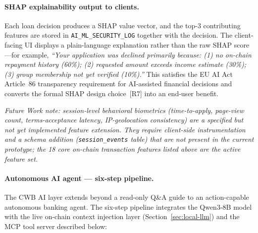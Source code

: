 \documentclass[12pt,a4paper]{report}
\begin{document}
\paragraph{SHAP explainability output to clients.}
Each loan decision produces a SHAP value vector, and the top-3 contributing features are stored in \texttt{AI\_ML\_SECURITY\_LOG} together with the decision. The client-facing UI displays a plain-language explanation rather than the raw SHAP score---for example, \emph{``Your application was declined primarily because: (1) no on-chain repayment history (60\%); (2) requested amount exceeds income estimate (30\%); (3) group membership not yet verified (10\%).''} This satisfies the EU AI Act Article~86 transparency requirement for AI-assisted financial decisions and converts the formal SHAP design choice~[R7] into an end-user benefit.

\noindent\textit{Future Work note: session-level behavioral biometrics (time-to-apply, page-view count, terms-acceptance latency, IP-geolocation consistency) are a specified but not yet implemented feature extension. They require client-side instrumentation and a schema addition (\texttt{session\_events} table) that are not present in the current prototype; the 18 core on-chain transaction features listed above are the active feature set.}

\paragraph{Autonomous AI agent --- six-step pipeline.}

The CWB AI layer extends beyond a read-only Q\&A guide to an action-capable autonomous banking agent. The six-step pipeline integrates the Qwen3-8B model with the live on-chain context injection layer (Section~\ref{sec:local-llm}) and the MCP tool server described below:
\end{document}
